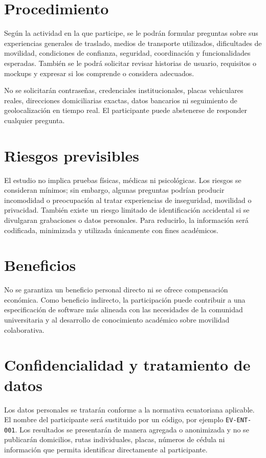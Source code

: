 \documentclass[10pt,a4paper]{article}
\begin{document}
\section{Procedimiento}

Según la actividad en la que participe, se le podrán formular preguntas sobre sus experiencias generales de traslado, medios de transporte utilizados, dificultades de movilidad, condiciones de confianza, seguridad, coordinación y funcionalidades esperadas. También se le podrá solicitar revisar historias de usuario, requisitos o mockups y expresar si los comprende o considera adecuados.

No se solicitarán contraseñas, credenciales institucionales, placas vehiculares reales, direcciones domiciliarias exactas, datos bancarios ni seguimiento de geolocalización en tiempo real. El participante puede abstenerse de responder cualquier pregunta.

\section{Riesgos previsibles}

El estudio no implica pruebas físicas, médicas ni psicológicas. Los riesgos se consideran mínimos; sin embargo, algunas preguntas podrían producir incomodidad o preocupación al tratar experiencias de inseguridad, movilidad o privacidad. También existe un riesgo limitado de identificación accidental si se divulgaran grabaciones o datos personales. Para reducirlo, la información será codificada, minimizada y utilizada únicamente con fines académicos.

\section{Beneficios}

No se garantiza un beneficio personal directo ni se ofrece compensación económica. Como beneficio indirecto, la participación puede contribuir a una especificación de software más alineada con las necesidades de la comunidad universitaria y al desarrollo de conocimiento académico sobre movilidad colaborativa.

\section{Confidencialidad y tratamiento de datos}

Los datos personales se tratarán conforme a la normativa ecuatoriana aplicable. El nombre del participante será sustituido por un código, por ejemplo \texttt{EV-ENT-001}. Los resultados se presentarán de manera agregada o anonimizada y no se publicarán domicilios, rutas individuales, placas, números de cédula ni información que permita identificar directamente al participante.
\end{document}
